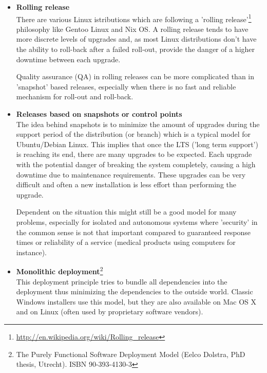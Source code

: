 \documentclass[a4paper,10pt]{article}
\begin{document}
\begin{itemize}
\item \textbf{Rolling release}\\
There are various Linux istributions which are following a 'rolling release'\footnote{\url{http://en.wikipedia.org/wiki/Rolling_release}} philosophy like Gentoo Linux  and Nix OS. A rolling release tends to have more discrete levels of upgrades and, as most Linux distributions don't have the ability to roll-back after a failed roll-out, provide the danger of a higher downtime between each upgrade. 

Quality assurance (QA) in rolling releases can be more complicated than in 'snapshot' based releases, especially when there is no fast and reliable mechanism for roll-out and roll-back.

\item \textbf{Releases based on snapshots or control points}\\
The idea behind snapshots is to minimize the amount of upgrades during the support period of the distribution (or branch) which is a typical model for Ubuntu/Debian Linux. This implies that once the LTS ('long term support') is reaching its end, there are many upgrades to be expected. Each upgrade with the potential danger of breaking the system completely, causing a high downtime due to maintenance requirements. These upgrades can be very difficult and often a new installation is less effort than performing the upgrade. 

Dependent on the situation this might still be a good model for many problems, especially for isolated and autonomous systems where 'security' in the common sense is not that important compared to guaranteed response times or reliability of a service (medical products using computers for instance).

\item \textbf{Monolithic deployment}\footnote{The Purely Functional Software Deployment Model (Eelco Dolstra, PhD thesis, Utrecht). ISBN 90-393-4130-3}\\
This deployment principle tries to bundle all dependencies into the deployment thus minimizing the dependencies to the outside world. Classic Windows installers use this model, but they are also available on Mac OS X and on Linux (often used by proprietary software vendors).
\end{itemize}
\end{document}
